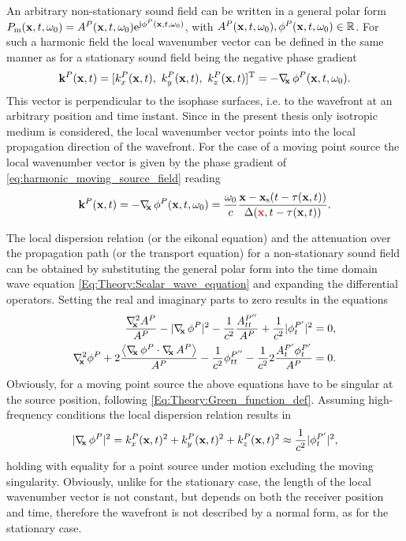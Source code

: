 An arbitrary non-stationary sound field can be written in a general polar form $P_{\mathrm{m}}(\mathbf{x},t,\omega_0) = A^P(\mathbf{x},t,\omega_0) \mathrm{e}^{\mathrm{j} \phi^P(\mathbf{x},t,\omega_0)}$, with $A^P(\mathbf{x},t,\omega_0),\phi^P(\mathbf{x},t,\omega_0) \in \mathbb{R}$.
For such a harmonic field the local wavenumber vector can be defined in the same manner as for a stationary sound field being the negative phase gradient
\begin{equation}
\label{eq:HF_appr:general_loc_wn}
\mathbf{k}^P(\mathbf{x},t) = [k_x^P(\mathbf{x},t),\ k_y^P(\mathbf{x},t),\ k_z^P(\mathbf{x},t)]^{\mathrm{T}} = -\nabla_{\!\!\mathbf{x}}\, \phi^P(\mathbf{x},t,\omega_0).
\end{equation}
This vector is perpendicular to the isophase surfaces, i.e. to the wavefront at an arbitrary position and time instant.
Since in the present thesis only isotropic medium is considered, the local wavenumber vector points into the local propagation direction of the wavefront.
For the case of a moving point source the local wavenumber vector is given by the phase gradient of \eqref{eq:harmonic_moving_source_field} reading
\begin{equation}
\label{eq:HF_appr:moving_s_loc_wn}
\mathbf{k}^P(\mathbf{x},t) = -\nabla_{\!\!\mathbf{x}}\, \phi^P(\mathbf{x},t,\omega_0) = \frac{\omega_0}{c} \frac{\mathbf{x} -\mathbf{x}_{\mathrm{s}}(t-\tau(\mathbf{x},t))}{\Delta(\textcolor{red}{\mathbf{x}}, t-\tau(\mathbf{x},t))}.
\end{equation}

The local dispersion relation (or the eikonal equation) and the attenuation over the propagation path (or the transport equation) for a non-stationary sound field can be obtained by substituting the general polar form into the time domain wave equation \eqref{Eq:Theory:Scalar_wave_equation} and expanding the differential operators.
Setting the real and imaginary parts to zero results in the equations
\begin{eqnarray}
\frac{\Lx A^P}{A^P}  - | \Dx \phi^P |^2 -\frac{1}{c^2} \frac{A^{P''}_{tt}}{A^P} +\frac{1}{c^2}|\phi^{P'}_{t}|^2 = 0, \\ 
\label{eq:HF_appr:transport_eq_non_stat}
\Lx \phi^P + 2\frac{ \left< \Dx \phi^P \cdot \Dx A^P \right> }{A^P} - \frac{1}{c^2} \phi^{P''}_{tt} - \frac{1}{c^2} 2\frac{A^{P'}_t \phi^{P'}_t }{A^P} = 0.
\end{eqnarray}
Obviously, for a moving point source the above equations have to be singular at the source position, following \eqref{Eq:Theory:Green_function_def}.
Assuming high-frequency conditions the local dispersion relation results in
\begin{equation} \label{eq:HF_appr:eikonal_eq_non_stat}
| \nabla_{\!\!\mathbf{x}}\, \phi^P |^2 = k_x^P(\mathbf{x},t)^2 + k_y^P(\mathbf{x},t)^2 + k_z^P(\mathbf{x},t)^2 \approx \frac{1}{c^2}|\phi^{P'}_{t}|^2,
\end{equation}
holding with equality for a point source under motion excluding the moving singularity.
Obviously, unlike for the stationary case, the length of the local wavenumber vector is not constant, but depends on both the receiver position and time, therefore the wavefront is not described by a normal form, as for the stationary case.

